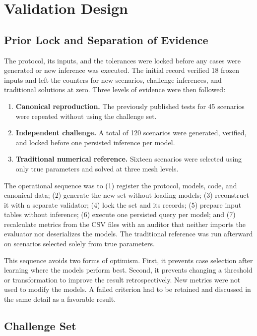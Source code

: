 \documentclass[11pt,a4paper]{article}
\begin{document}
\section{Validation Design}

\subsection{Prior Lock and Separation of Evidence}

The protocol, its inputs, and the tolerances were locked before any cases were
generated or new inference was executed. The initial record verified 18 frozen
inputs and left the counters for new scenarios, challenge inferences, and
traditional solutions at zero. Three levels of evidence were then followed:

\begin{enumerate}
    \item \textbf{Canonical reproduction.} The previously published tests for
    45 scenarios were repeated without using the challenge set.
    \item \textbf{Independent challenge.} A total of 120 scenarios were
    generated, verified, and locked before one persisted inference per model.
    \item \textbf{Traditional numerical reference.} Sixteen scenarios were
    selected using only true parameters and solved at three mesh levels.
\end{enumerate}

The operational sequence was to (1) register the protocol, models, code, and
canonical data; (2) generate the new set without loading models; (3) reconstruct
it with a separate validator; (4) lock the set and its records; (5) prepare
input tables without inference; (6) execute one persisted query per model; and
(7) recalculate metrics from the CSV files with an auditor that neither imports
the evaluator nor deserializes the models. The traditional reference was run
afterward on scenarios selected solely from true parameters.

This sequence avoids two forms of optimism. First, it prevents case selection
after learning where the models perform best. Second, it prevents changing a
threshold or transformation to improve the result retrospectively. New metrics
were not used to modify the models. A failed criterion had to be retained and
discussed in the same detail as a favorable result.

\subsection{Challenge Set}
\end{document}
